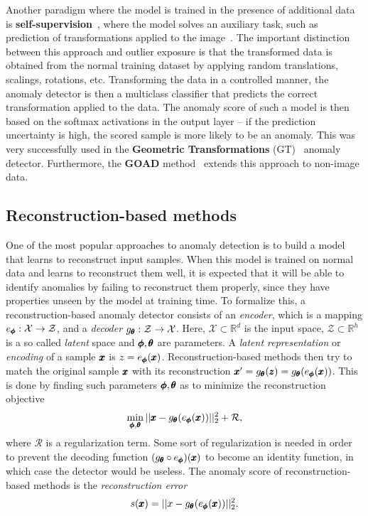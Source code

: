 Another paradigm where the model is trained in the presence of additional data is \textbf{self-supervision}~\cite{kolesnikov2019revisiting}, where the model solves an auxiliary task, such as prediction of transformations applied to the image~\cite{chen2020simple}. The important distinction between this approach and outlier exposure is that the transformed data is obtained from the normal training dataset by applying random translations, scalings, rotations, etc. Transforming the data in a controlled manner, the anomaly detector is then a multiclass classifier that predicts the correct transformation applied to the data. The anomaly score of such a model is then based on the softmax activations in the output layer -- if the prediction uncertainty is high, the scored sample is more likely to be an anomaly. This was very successfully used in the \textbf{Geometric Transformations} (GT)~\cite{golan2018deep} anomaly detector. Furthermore, the \textbf{GOAD} method~\cite{bergman2020classification} extends this approach to non-image data.

\subsection{Reconstruction-based methods} \label{sec:reconstruction_models}
One of the most popular approaches to anomaly detection is to build a model that learns to reconstruct input samples. When this model is trained on normal data and learns to reconstruct them well, it is expected that it will be able to identify anomalies by failing to reconstruct them properly, since they have properties unseen by the model at training time. To formalize this, a reconstruction-based anomaly detector consists of an \textit{encoder}, which is a mapping $e_{\pmb{{\phi}}}:\mathcal{X} \rightarrow \mathcal{Z}$, and a \textit{decoder} $g_{\pmb{{\theta}}}: \mathcal{Z} \rightarrow \mathcal{X}$. Here, $\mathcal{X} \subset \mathbb{R}^d$ is the input space, $\mathcal{Z} \subset \mathbb{R}^h$ is a so called \textit{latent} space and $\pmb{{\phi}},\pmb{{\theta}}$ are parameters. A \textit{latent representation} or \textit{encoding} of a sample $\pmb{{x}}$ is $z = e_{\pmb{{\phi}}}(\pmb{{x}})$. Reconstruction-based methods then try to match the original sample $\pmb{{x}}$ with its reconstruction $\pmb{{x}}' = g_{\pmb{{\theta}}}(\pmb{{z}})=g_{\pmb{{\theta}}}(e_{\pmb{{\phi}}}(\pmb{{x}}))$. This is done by finding such parameters $\pmb{{\phi}}, \pmb{{\theta}}$ as to minimize the reconstruction objective
\begin{equation} \label{eq:reconstruction_objective}
	\min_{\pmb{{\phi}}, \pmb{{\theta}}} \vert \vert \pmb{{x}} - g_{\pmb{{\theta}}}(e_{\pmb{{\phi}}}(\pmb{{x}})) \vert \vert_2^2 + \mathcal{R},
\end{equation}
where $\mathcal{R}$ is a regularization term. Some sort of regularization is needed in order to prevent the decoding function $(g_{\pmb{{\theta}}} \circ e_{\pmb{{\phi}}})(\pmb{{x}})$ to become an identity function, in which case the detector would be useless. The anomaly score of reconstruction-based methods is the \textit{reconstruction error}
\begin{equation} \label{eq:reconstruction_error}
	s(\pmb{{x}}) = \vert \vert x - g_{\pmb{{\theta}}}(e_{\pmb{{\phi}}}(\pmb{{x}})) \vert \vert_2^2.
\end{equation}


